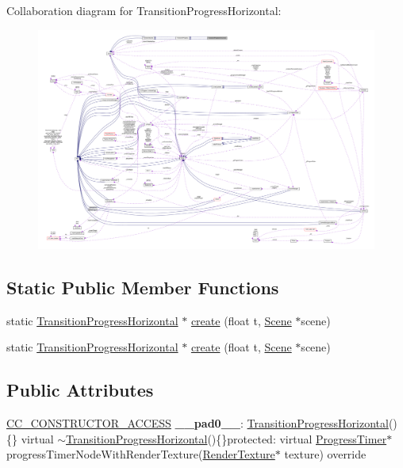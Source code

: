 Collaboration diagram for Transition\+Progress\+Horizontal\+:
\nopagebreak
\begin{figure}[H]
\begin{center}
\leavevmode
\includegraphics[width=350pt]{classTransitionProgressHorizontal__coll__graph}
\end{center}
\end{figure}
\subsection*{Static Public Member Functions}
\begin{DoxyCompactItemize}
\item 
static \hyperlink{classTransitionProgressHorizontal}{Transition\+Progress\+Horizontal} $\ast$ \hyperlink{classTransitionProgressHorizontal_a85609ebd5932061eb93ee0896146ddb4}{create} (float t, \hyperlink{classScene}{Scene} $\ast$scene)
\item 
static \hyperlink{classTransitionProgressHorizontal}{Transition\+Progress\+Horizontal} $\ast$ \hyperlink{classTransitionProgressHorizontal_ab871b164a33ba2e7765575634a0585ed}{create} (float t, \hyperlink{classScene}{Scene} $\ast$scene)
\end{DoxyCompactItemize}
\subsection*{Public Attributes}
\begin{DoxyCompactItemize}
\item 
\mbox{\label{classTransitionProgressHorizontal_a17d3b3d6297f14960b3b2eb25312de53}} 
\hyperlink{_2cocos2d_2cocos_2base_2ccConfig_8h_a25ef1314f97c35a2ed3d029b0ead6da0}{C\+C\+\_\+\+C\+O\+N\+S\+T\+R\+U\+C\+T\+O\+R\+\_\+\+A\+C\+C\+E\+SS} {\bfseries \+\_\+\+\_\+pad0\+\_\+\+\_\+}\+: \hyperlink{classTransitionProgressHorizontal}{Transition\+Progress\+Horizontal}()\{\} virtual $\sim$\hyperlink{classTransitionProgressHorizontal}{Transition\+Progress\+Horizontal}()\{\}protected\+: virtual \hyperlink{classProgressTimer}{Progress\+Timer}$\ast$ progress\+Timer\+Node\+With\+Render\+Texture(\hyperlink{classRenderTexture}{Render\+Texture}$\ast$ texture) override
\end{DoxyCompactItemize}
